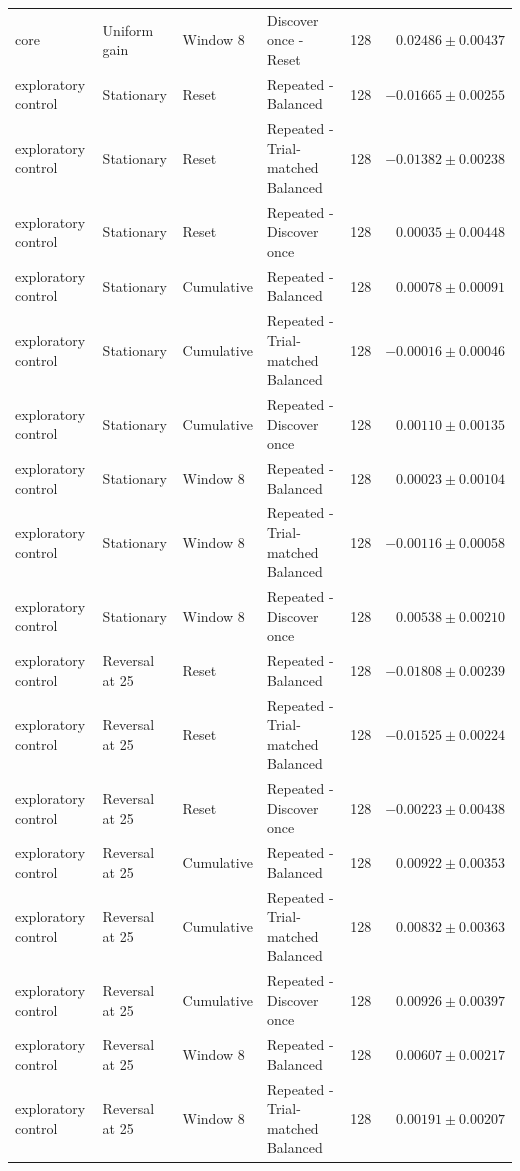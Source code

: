 \begin{longtable}{@{}lp{.19\linewidth}lp{.29\linewidth}rr@{}}
core & Uniform gain & Window 8 & Discover once - Reset & 128 & $0.02486 \pm 0.00437$ \\
exploratory control & Stationary & Reset & Repeated - Balanced & 128 & $-0.01665 \pm 0.00255$ \\
exploratory control & Stationary & Reset & Repeated - Trial-matched Balanced & 128 & $-0.01382 \pm 0.00238$ \\
exploratory control & Stationary & Reset & Repeated - Discover once & 128 & $0.00035 \pm 0.00448$ \\
exploratory control & Stationary & Cumulative & Repeated - Balanced & 128 & $0.00078 \pm 0.00091$ \\
exploratory control & Stationary & Cumulative & Repeated - Trial-matched Balanced & 128 & $-0.00016 \pm 0.00046$ \\
exploratory control & Stationary & Cumulative & Repeated - Discover once & 128 & $0.00110 \pm 0.00135$ \\
exploratory control & Stationary & Window 8 & Repeated - Balanced & 128 & $0.00023 \pm 0.00104$ \\
exploratory control & Stationary & Window 8 & Repeated - Trial-matched Balanced & 128 & $-0.00116 \pm 0.00058$ \\
exploratory control & Stationary & Window 8 & Repeated - Discover once & 128 & $0.00538 \pm 0.00210$ \\
exploratory control & Reversal at 25 & Reset & Repeated - Balanced & 128 & $-0.01808 \pm 0.00239$ \\
exploratory control & Reversal at 25 & Reset & Repeated - Trial-matched Balanced & 128 & $-0.01525 \pm 0.00224$ \\
exploratory control & Reversal at 25 & Reset & Repeated - Discover once & 128 & $-0.00223 \pm 0.00438$ \\
exploratory control & Reversal at 25 & Cumulative & Repeated - Balanced & 128 & $0.00922 \pm 0.00353$ \\
exploratory control & Reversal at 25 & Cumulative & Repeated - Trial-matched Balanced & 128 & $0.00832 \pm 0.00363$ \\
exploratory control & Reversal at 25 & Cumulative & Repeated - Discover once & 128 & $0.00926 \pm 0.00397$ \\
exploratory control & Reversal at 25 & Window 8 & Repeated - Balanced & 128 & $0.00607 \pm 0.00217$ \\
exploratory control & Reversal at 25 & Window 8 & Repeated - Trial-matched Balanced & 128 & $0.00191 \pm 0.00207$ \\

\end{longtable}

